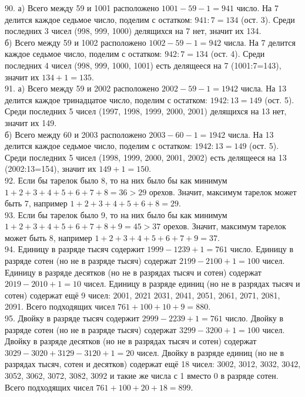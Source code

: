 \documentclass[12pt]{article}
\begin{document}
90. а) Всего между 59 и 1001 расположено $1001-59-1=941$ число. На 7 делится каждое седьмое число, поделим с остатком: $941:7=134$ (ост. 3). Среди последних 3 чисел (998, 999, 1000) делящихся на 7 нет, значит их 134.\\
б) Всего между 59 и 1002 расположено $1002-59-1=942$ числа. На 7 делится каждое седьмое число, поделим с остатком: $942:7=134$ (ост. 4). Среди последних 4 чисел (998, 999, 1000, 1001) есть делящееся на 7 (1001:7=143), значит их $134+1=135.$\\
91. а) Всего между 59 и 2002 расположено $2002-59-1=1942$ числа. На 13 делится каждое тринадцатое число, поделим с остатком: $1942:13=149$ (ост. 5). Среди последних 5 чисел (1997, 1998, 1999, 2000, 2001) делящихся на 13 нет, значит их 149.\\
б) Всего между 60 и 2003 расположено $2003-60-1=1942$ числа. На 13 делится каждое седьмое число, поделим с остатком: $1942:13=149$ (ост. 5). Среди последних 5 чисел (1998, 1999, 2000, 2001, 2002) есть делящееся на 13 (2002:13=154), значит их $149+1=150.$\\
92. Если бы тарелок было 8, то на них было бы как минимум $1+2+3+4+5+6+7+8=36>29$ орехов. Значит, максимум тарелок может быть 7, например $1+2+3+4+5+6+8=29.$\\
93. Если бы тарелок было 9, то на них было бы как минимум $1+2+3+4+5+6+7+8+9=45>37$ орехов. Значит, максимум тарелок может быть 8, например $1+2+3+4+5+6+7+9=37.$\\
94. Единицу в разряде тысяч содержит $1999-1239+1=761$ число. Единицу в разряде сотен (но не в разряде тысяч) содержат $2199-2100+1=100$ чисел. Единицу в разряде десятков (но не в разрядах тысяч и сотен) содержат $2019-2010+1=10$ чисел. Единицу в разряде единиц (но не в разрядах тысяч и сотен) содержат ещё 9 чисел: 2001, 2021 2031, 2041, 2051, 2061, 2071, 2081, 2091. Всего подходящих чисел $761+100+10+9=880.$\\
95. Двойку в разряде тысяч содержит $2999-2239+1=761$ число. Двойку в разряде сотен (но не в разряде тысяч) содержат $3299-3200+1=100$ чисел. Двойку в разряде десятков (но не в разрядах тысяч и сотен) содержат $3029-3020+3129-3120+1=20$ чисел. Двойку в разряде единиц (но не в разрядах тысяч, сотен и десятков) содержат ещё 18 чисел: 3002, 3012, 3032, 3042, 3052, 3062, 3072, 3082, 3092 и такие же числа с 1 вместо 0 в разряде сотен. Всего подходящих чисел $761+100+20+18=899.$\\
\end{document}
